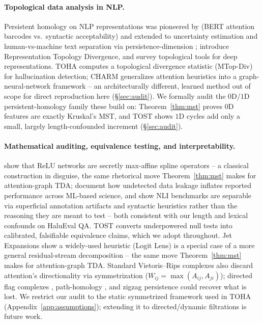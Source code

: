 \paragraph{Topological data analysis in NLP.} Persistent homology on NLP representations was pioneered by \citet{kushnareva2021,cherniavskii2022} (BERT attention barcodes vs.\ syntactic acceptability) and extended to uncertainty estimation \citep{kostenok2023} and human-vs-machine text separation via persistence-dimension \citep{tulchinskii2023intrinsic}; \citet{barannikov2022rtd} introduce Representation Topology Divergence, and \citet{magai2022topology} survey topological tools for deep representations. TOHA \citep{toha} computes a topological divergence statistic (MTop-Div) for hallucination detection; CHARM \citep{charm} generalizes attention heuristics into a graph-neural-network framework -- an architecturally different, learned method out of scope for direct reproduction here (\S\ref{sec:audit}). We formally audit the $0$D/$1$D persistent-homology family these build on: Theorem~\ref{thm:mst} proves $0$D features are exactly Kruskal's MST, and TOST shows $1$D cycles add only a small, largely length-confounded increment (\S\ref{sec:audit}).

\paragraph{Mathematical auditing, equivalence testing, and interpretability.} \citet{balestriero2021} show that ReLU networks are secretly max-affine spline operators -- a classical construction in disguise, the same rhetorical move Theorem~\ref{thm:mst} makes for attention-graph TDA; \citet{kapoor2023leakage} document how undetected data leakage inflates reported performance across ML-based science, and \citet{gururangan2018annotation,mccoy2019right} show NLI benchmarks are separable via superficial annotation artifacts and syntactic heuristics rather than the reasoning they are meant to test -- both consistent with our length and lexical confounds on HaluEval QA. TOST \citep{walker2011,lakens2017equivalence} converts underpowered null tests into calibrated, falsifiable equivalence claims, which we adopt throughout. Jet Expansions \citep{chen2026jets} show a widely-used heuristic (Logit Lens) is a special case of a more general residual-stream decomposition -- the same move Theorem~\ref{thm:mst} makes for attention-graph TDA. Standard Vietoris--Rips complexes also discard attention's directionality via symmetrization ($W_{ij}=\max(A_{ij},A_{ji})$); directed flag complexes \citep{grigoryan2018}, path-homology \citep{grigoryan2014}, and zigzag persistence \citep{carlsson2010} could recover what is lost. We restrict our audit to the static symmetrized framework used in TOHA (Appendix~\ref{app:assumptions}); extending it to directed/dynamic filtrations is future work.
